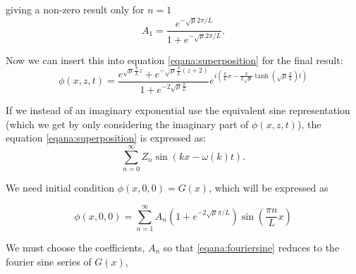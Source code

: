 \documentclass[11pt]{article}
\begin{document}
giving a non-zero result only for $n=1$
\begin{equation}
A_1 = \frac{e^{- \sqrt{\mu}2\pi  /L } }{1 + e^{- \sqrt{\mu} 2\pi /L}}.
\end{equation}


Now we can insert this into equation \ref{eqana:superposition} for the final result:
\begin{equation}
\phi(x,z,t) = \frac{ e^{ \sqrt{\mu} \frac{\pi }{L}z}  + e^{ -\sqrt{\mu}\frac{\pi }{L}(z+2)    }}{1 + e^{-2\sqrt{\mu}\frac{\pi }{L} }} e^{i \left( \frac{\pi }{L}x - \frac{\pi }{L\sqrt{\mu}} \tanh (\sqrt{\mu}\frac{\pi }{L})t \right)}
\end{equation}




If we instead of an imaginary exponential use the equivalent sine representation (which we get by only considering the imaginary part of $\phi(x,z,t)$), the equation \ref{eqana:superposition} is expressed as:
\begin{equation}
\sum_{n=0}^\infty Z_n \sin \left(  kx-\omega(k)t  \right).
\end{equation}

We need initial condition $\phi(x,0,0) = G(x)$, which will be expressed as

\begin{equation}
\label{eqana:fouriersine}
\phi(x,0,0) = \sum_{n=1}^\infty A_n \left( 1 + e^{-2\sqrt{\mu}\pi/L} \right) \sin \left( \frac{\pi n}{L}x \right)
\end{equation}

We must choose the coefficients, $A_n$ so that \ref{eqana:fouriersine} reduces to the fourier sine series of $G(x)$,
\end{document}
